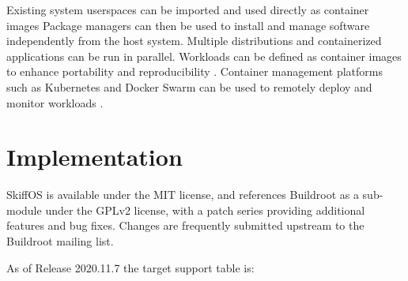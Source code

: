 \documentclass[english,]{IEEEtran}
\begin{document}
Existing system userspaces can be imported and used directly as
container images Package managers can then be used to install and manage
software independently from the host system. Multiple distributions and
containerized applications can be run in parallel. Workloads can be
defined as container images to enhance portability and reproducibility
\autocite{reworkflow}. Container management platforms such as Kubernetes
and Docker Swarm can be used to remotely deploy and monitor workloads
\autocite{autoveh}.

\hypertarget{implementation}{%
\section{Implementation}\label{implementation}}

SkiffOS is available under the MIT license, and references Buildroot as
a sub-module under the GPLv2 license, with a patch series providing
additional features and bug fixes. Changes are frequently submitted
upstream to the Buildroot mailing list.

As of Release 2020.11.7 the target support table is:
\end{document}

